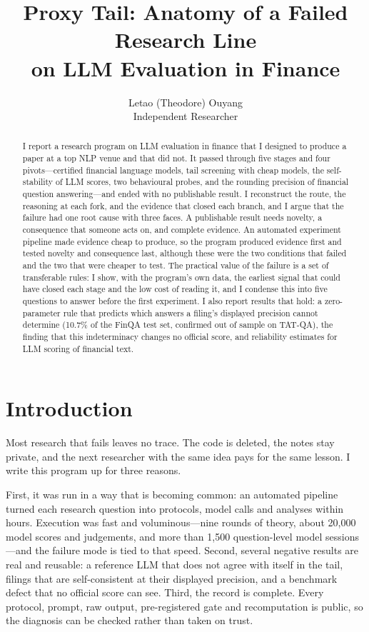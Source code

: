 \documentclass[11pt]{article}
\title{Proxy Tail: Anatomy of a Failed Research Line\\on LLM Evaluation in Finance}
\author{Letao (Theodore) Ouyang \\
  Independent Researcher}
\begin{document}
\maketitle

\begin{abstract}
I report a research program on LLM evaluation in finance that I designed to produce a paper at a top NLP venue and that did not. It passed through five stages and four pivots---certified financial language models, tail screening with cheap models, the self-stability of LLM scores, two behavioural probes, and the rounding precision of financial question answering---and ended with no publishable result. I reconstruct the route, the reasoning at each fork, and the evidence that closed each branch, and I argue that the failure had one root cause with three faces. A publishable result needs novelty, a consequence that someone acts on, and complete evidence. An automated experiment pipeline made evidence cheap to produce, so the program produced evidence first and tested novelty and consequence last, although these were the two conditions that failed and the two that were cheaper to test. The practical value of the failure is a set of transferable rules: I show, with the program's own data, the earliest signal that could have closed each stage and the low cost of reading it, and I condense this into five questions to answer before the first experiment. I also report results that hold: a zero-parameter rule that predicts which answers a filing's displayed precision cannot determine (10.7\% of the FinQA test set, confirmed out of sample on TAT-QA), the finding that this indeterminacy changes no official score, and reliability estimates for LLM scoring of financial text.
\end{abstract}

\section{Introduction}

Most research that fails leaves no trace. The code is deleted, the notes stay private, and the next researcher with the same idea pays for the same lesson. I write this program up for three reasons.

First, it was run in a way that is becoming common: an automated pipeline turned each research question into protocols, model calls and analyses within hours. Execution was fast and voluminous---nine rounds of theory, about 20{,}000 model scores and judgements, and more than 1{,}500 question-level model sessions---and the failure mode is tied to that speed. Second, several negative results are real and reusable: a reference LLM that does not agree with itself in the tail, filings that are self-consistent at their displayed precision, and a benchmark defect that no official score can see. Third, the record is complete. Every protocol, prompt, raw output, pre-registered gate and recomputation is public, so the diagnosis can be checked rather than taken on trust.
\end{document}
